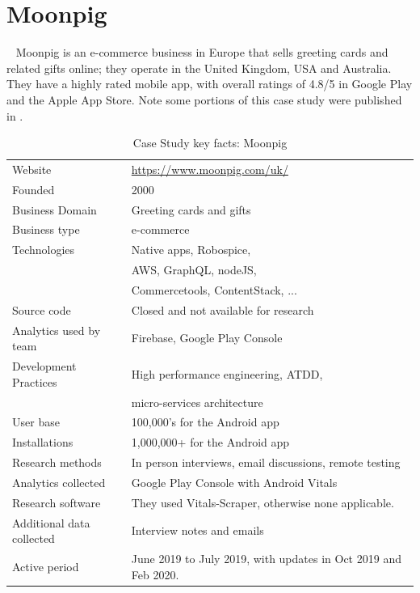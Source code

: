\section{Moonpig}~\label{study-moonpig}
Moonpig is an e-commerce business in Europe that sells greeting cards and related gifts online; they operate in the United Kingdom, USA and Australia. They have a highly rated mobile app, with overall ratings of 4.8/5 in Google Play and the Apple App Store. Note some portions of this case study were published in \citep{harty_better_android_apps_using_android_vitals}.

{\renewcommand{\arraystretch}{0.8}%
\begin{table}[htbp!]
    \centering
    \small
    \setlength{\tabcolsep}{1pt}
    \begin{tabular}{ll}
       \toprule
       Website &\url{https://www.moonpig.com/uk/} \\
       Founded &2000 \\
       Business Domain & Greeting cards and gifts \\
       Business type & e-commerce \\
       Technologies  & Native apps, Robospice, \\
       & AWS, GraphQL, nodeJS, \\
       & Commercetools, ContentStack, ... \\
       Source code  &Closed and not available for research \\
       Analytics used by team &Firebase, Google Play Console \\
       Development Practices & High performance engineering, ATDD, \\
         & micro-services architecture \\
       \midrule
       User base &100,000's for the Android app\\
       Installations &1,000,000+ for the Android app\\
       \midrule
       Research methods &In person interviews, email discussions, remote testing \\
       Analytics collected &Google Play Console with Android Vitals \\
       Research software &They used Vitals-Scraper, otherwise none applicable.\\
       Additional data collected &Interview notes and emails \\
       Active period &June 2019 to July 2019, with updates in Oct 2019 and Feb 2020. \\
       \bottomrule
    \end{tabular}
    \caption{Case Study key facts: Moonpig}
    \label{tab:moonpig_anaytics_overview}
\end{table}
}


